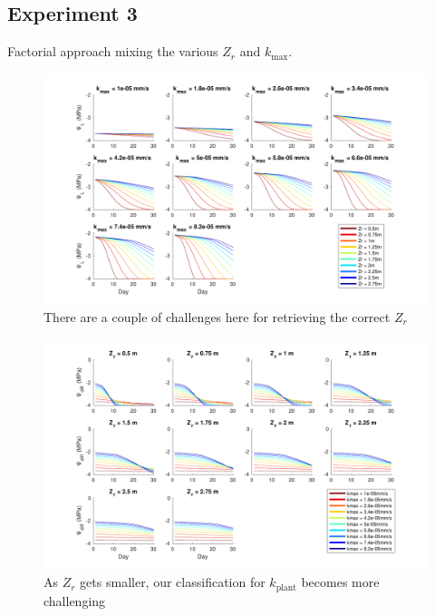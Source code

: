 \documentclass[11pt]{article}
\begin{document}
\clearpage
\subsection{Experiment 3}
Factorial approach mixing the various $Z_r$ and $k_\text{max}$.


\begin{figure}[h]
\centering
\includegraphics[width=40pc]{../figs/exp3a}
\caption{There are a couple of challenges here for retrieving the correct $Z_r$}
\label{fig:exp3a}
\end{figure}


\begin{figure}[h]
\centering
\includegraphics[width=40pc]{../figs/exp3b}
\caption{As $Z_r$ gets smaller, our classification for $k_\text{plant}$ becomes more challenging}
\label{fig:exp3b}
\end{figure}





\clearpage

\nocite{*}


\end{document}
